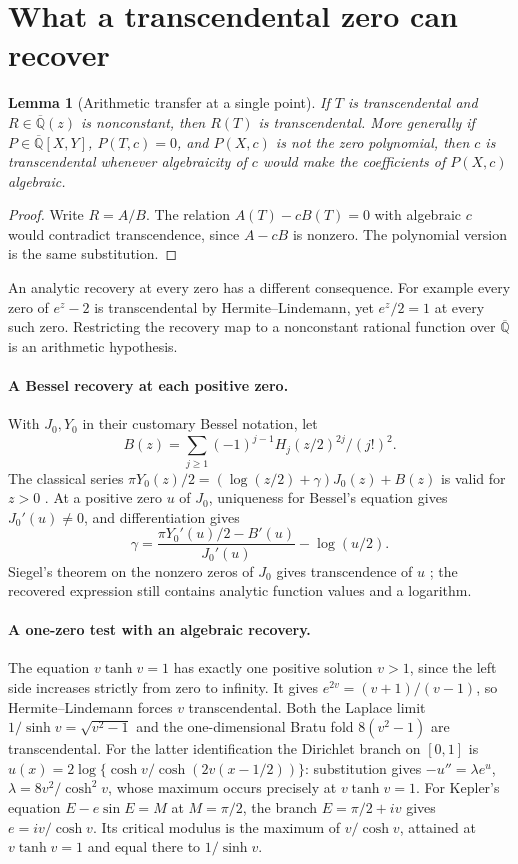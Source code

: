 \documentclass[11pt,a4paper]{article}
\newtheorem{lemma}[theorem]{Lemma}\newtheorem{proposition}[theorem]{Proposition}\newtheorem{corollary}[theorem]{Corollary}
\theoremstyle{definition}\newtheorem{definition}[theorem]{Definition}\newtheorem{example}[theorem]{Example}
\theoremstyle{remark}\newtheorem{remark}[theorem]{Remark}
\newcommand{\Q}{\mathbb Q}\newcommand{\Z}{\mathbb Z}\newcommand{\R}{\mathbb R}\newcommand{\N}{\mathbb N}
\begin{document}
\section{What a transcendental zero can recover}\label{sec:zeros}
\begin{lemma}[Arithmetic transfer at a single point]
If $T$ is transcendental and $R\in\overline{\Q}(z)$ is nonconstant, then $R(T)$ is transcendental. More generally if $P\in\overline{\Q}[X,Y]$, $P(T,c)=0$, and $P(X,c)$ is not the zero polynomial, then $c$ is transcendental whenever algebraicity of $c$ would make the coefficients of $P(X,c)$ algebraic.
\end{lemma}
\begin{proof}
Write $R=A/B$. The relation $A(T)-cB(T)=0$ with algebraic $c$ would contradict transcendence, since $A-cB$ is nonzero. The polynomial version is the same substitution.
\end{proof}
An analytic recovery at every zero has a different consequence. For example every zero of $e^z-2$ is transcendental by Hermite--Lindemann, yet $e^z/2=1$ at every such zero. Restricting the recovery map to a nonconstant rational function over $\overline{\Q}$ is an arithmetic hypothesis.

\paragraph{A Bessel recovery at each positive zero.}
With $J_0,Y_0$ in their customary Bessel notation, let
\[
B(z)=\sum_{j\ge1}(-1)^{j-1}H_j(z/2)^{2j}/(j!)^2.
\]
The classical series $\pi Y_0(z)/2=(\log(z/2)+\gamma)J_0(z)+B(z)$ is valid for $z>0$ \cite{DLMF}. At a positive zero $u$ of $J_0$, uniqueness for Bessel's equation gives $J_0'(u)\ne0$, and differentiation gives
\[
\gamma=\frac{\pi Y_0'(u)/2-B'(u)}{J_0'(u)}-\log(u/2).
\]
Siegel's theorem on the nonzero zeros of $J_0$ gives transcendence of $u$ \cite{SiegelBessel}; the recovered expression still contains analytic function values and a logarithm.

\paragraph{A one-zero test with an algebraic recovery.}
The equation $v\tanh v=1$ has exactly one positive solution $v>1$, since the left side increases strictly from zero to infinity. It gives
$e^{2v}=(v+1)/(v-1)$, so Hermite--Lindemann forces $v$ transcendental. Both the Laplace limit $1/\sinh v=\sqrt{v^2-1}$ and the one-dimensional Bratu fold $8(v^2-1)$ are transcendental. For the latter identification the Dirichlet branch on $[0,1]$ is $u(x)=2\log\{\cosh v/\cosh(2v(x-1/2))\}$: substitution gives $-u''=\lambda e^u$, $\lambda=8v^2/\cosh^2v$, whose maximum occurs precisely at $v\tanh v=1$. For Kepler's equation $E-e\sin E=M$ at $M=\pi/2$, the branch $E=\pi/2+iv$ gives $e=iv/\cosh v$. Its critical modulus is the maximum of $v/\cosh v$, attained at $v\tanh v=1$ and equal there to $1/\sinh v$.
\end{document}
